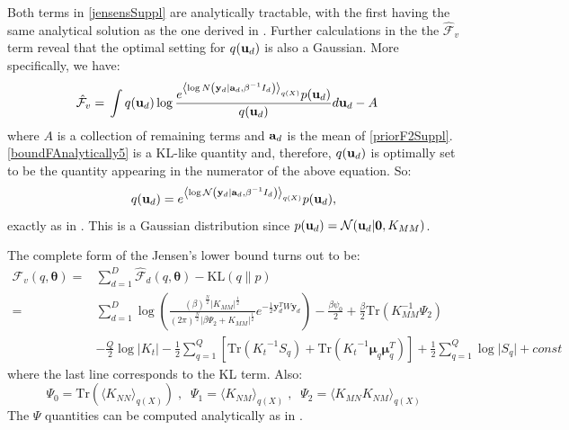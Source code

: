 Both terms in \eqref{jensensSuppl} are analytically tractable, with the first having the same analytical solution as the one derived in \cite{BayesianGPLVM}. Further calculations in the the $\hat{\mathcal{F}}_v$ term reveal that the optimal setting for $q(\mathbf{u}_d)$ is also a Gaussian. More specifically, 
we have:
\begin{align}
\hat{\mathcal{F}}_v={}& \int q(\mathbf{u}_d) \log \frac{e^{\left\langle \log N \left( \mathbf{y}_d | \mathbf{a}_d, \beta^{-1} I_d \right) \right\rangle_{q(X)}}
		p(\mathbf{u}_d)}{q(\mathbf{u}_d)} d\mathbf{u}_d - A \label{boundFAnalytically5}
\end{align}
where $A$ is a collection of remaining terms and $\mathbf{a}_d$ is the mean of \eqref{priorF2Suppl}.
\eqref{boundFAnalytically5} is a KL-like quantity and, therefore, $q(\mathbf{u}_d)$ is optimally set to be the quantity appearing in the numerator of the above equation. So:
\begin{equation}
\label{qu}
q(\mathbf{u}_d) = e^{\left\langle \log \mathcal{N} \left( \mathbf{y}_d | \mathbf{a}_d, \beta^{-1} I_d \right) \right\rangle_{q(X)}}
		p(\mathbf{u}_d) ,
\end{equation}
exactly as in \cite{BayesianGPLVM}. This is a Gaussian distribution since $p(\mathbf{u}_d ) = \mathcal{N} (\mathbf{u}_d | \mathbf{0}, K_{MM} )$.

\par
The complete form of the Jensen's lower bound turns out to be:
\begin{align}
\mathcal{F}_v(q, \boldsymbol \theta) = {}& \sum_{d=1}^{D} 
	\hat{\mathcal{F}}_d(q, \boldsymbol \theta) -  \text{KL}(q \parallel p) \nonumber \\
	= {}& 
	\sum_{d=1}^{D} 
		\log \left( 
		\frac{(\beta)^{\frac{N}{2}} \vert \mathit{K_{MM}} \vert ^\frac{1}{2} }
			 {(2\pi)^{\frac{N}{2}} \vert \beta \Psi_2 + \mathit{K_{MM}}  \vert ^\frac{1}{2} } 	
		 e^{-\frac{1}{2} \mathbf{y}^{T}_{d} W \mathbf{y}_d} 
		 \right) -
		 \frac{\beta \psi_0}{2} + \frac{\beta}{2} 
		 \text{Tr} \left( \mathit{K_{MM}^{-1}} \Psi_2 \right)  \nonumber \\
{}&	- \frac{Q}{2} \log \vert \mathit{K_t} \vert - \frac{1}{2} \sum_{q=1}^{Q}
	  \left[ \text{Tr} \left( \mathit{K_t}^{-1} \mathit{S_q} \right)	  
	  	   + \text{Tr} \left( \mathit{K_t}^{-1} \boldsymbol \mu_q \boldsymbol \mu_q^T \right) \right] 
	 + \frac{1}{2} \sum_{q=1}^Q \log \vert \mathit{S_q} \vert + const  \label{boundFinal}
\end{align}
where the last line corresponds to the KL term. Also:
\begin{equation}
\label{psis}
\Psi_0 = \text{Tr}(\langle \mathit{K_{NN}} \rangle_{q(\mathit{X})}) \;, \;\;
\Psi_1 = \langle \mathit{K_{NM}} \rangle_{q(\mathit{X})} \;, \;\;
\Psi_2 = \langle \mathit{K_{MN}} \mathit{K_{NM}} \rangle_{q(\mathit{X})}
\end{equation}
The $\Psi$ quantities can be computed analytically as in \cite{BayesianGPLVM}.


